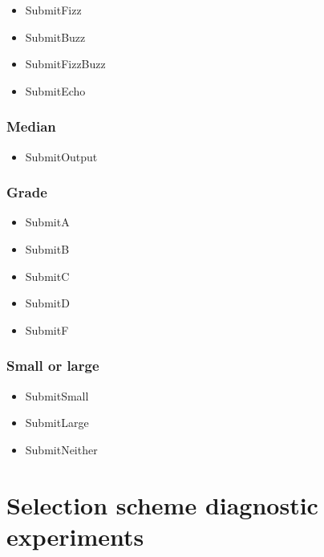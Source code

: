 \documentclass[
]{book}
\providecommand{\tightlist}{%
  \setlength{\itemsep}{0pt}\setlength{\parskip}{0pt}}
\begin{document}
\begin{itemize}
\tightlist
\item
  SubmitFizz
\item
  SubmitBuzz
\item
  SubmitFizzBuzz
\item
  SubmitEcho
\end{itemize}

\hypertarget{median}{%
\subsection{Median}\label{median}}

\begin{itemize}
\tightlist
\item
  SubmitOutput
\end{itemize}

\hypertarget{grade}{%
\subsection{Grade}\label{grade}}

\begin{itemize}
\tightlist
\item
  SubmitA
\item
  SubmitB
\item
  SubmitC
\item
  SubmitD
\item
  SubmitF
\end{itemize}

\hypertarget{small-or-large}{%
\subsection{Small or large}\label{small-or-large}}

\begin{itemize}
\tightlist
\item
  SubmitSmall
\item
  SubmitLarge
\item
  SubmitNeither
\end{itemize}

\hypertarget{selection-scheme-diagnostic-experiments}{%
\chapter{Selection scheme diagnostic experiments}\label{selection-scheme-diagnostic-experiments}}
\end{document}
